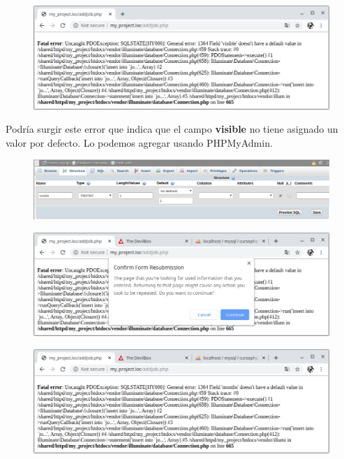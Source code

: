 \documentclass{article}
\begin{document}
\newpage

\begin{figure}[h!]
  \centering
  \includegraphics[scale=0.5]{./Pictures/082_visible_error.png}
\end{figure}

Podría surgir este error que indica que el campo \textbf{visible} no tiene
asignado un valor por defecto. Lo podemos agregar usando  PHPMyAdmin.\\

\begin{figure}[h!]
  \centering
  \includegraphics[scale=0.5]{./Pictures/083_visible_default.png}
\end{figure}

\begin{figure}[h!]
  \centering
  \includegraphics[scale=0.5]{./Pictures/084_reenvio_form.png}
\end{figure}

\begin{figure}[h!]
  \centering
  \includegraphics[scale=0.5]{./Pictures/085_month_error.png}
\end{figure}
\end{document}
